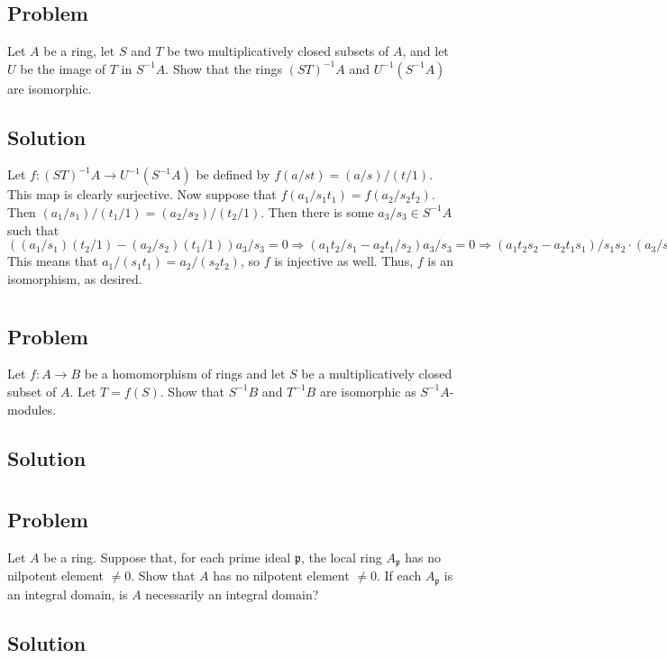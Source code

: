 \documentclass[book,12pt,oneside,openany]{memoir}
\begin{document}
\section{}
\subsection{Problem}
Let $A$ be a ring, let $S$ and $T$ be two multiplicatively closed subsets of $A$, and let $U$ be the image of $T$ in $S^{-1}A$. Show that the rings $(ST)^{-1}A$ and $U^{-1}(S^{-1}A)$ are isomorphic.

\subsection{Solution}
Let $f: (ST)^{-1}A \rightarrow U^{-1}(S^{-1}A)$ be defined by $f(a/st) = (a/s)/(t/1)$. This map is clearly surjective. Now suppose that $f(a_1/s_1t_1) = f(a_2/s_2t_2)$. Then $(a_1/s_1)/(t_1/1) = (a_2/s_2)/(t_2/1)$. Then there is some $a_3/s_3 \in S^{-1}A$ such that $((a_1/s_1)(t_2/1) - (a_2/s_2)(t_1/1))a_3/s_3 = 0 \Rightarrow (a_1 t_2/s_1 - a_2 t_1/s_2)a_3/s_3 = 0 \Rightarrow (a_1t_2s_2 - a_2 t_1s_1)/s_1 s_2 \cdot (a_3/s_3) = 0 \Rightarrow a_1t_2s_2a_3 - a_2 t_1 s_1 a_3 = 0 $ This means that $a_1/(s_1t_1) = a_2/(s_2t_2)$, so $f$ is injective as well. Thus, $f$ is an isomorphism, as desired.

\section{}
\subsection{Problem}
Let $f: A \rightarrow B$ be a homomorphism of rings and let $S$ be a multiplicatively closed subset of $A$. Let $T = f(S)$. Show that $S^{-1}B$ and $T^{-1}B$ are isomorphic as $S^{-1}A$-modules.

\subsection{Solution}

\section{}
\subsection{Problem}
Let $A$ be a ring. Suppose that, for each prime ideal $\mathfrak{p}$, the local ring $A_{\mathfrak{p}}$ has no nilpotent element $\neq 0$. Show that $A$ has no nilpotent element $\neq 0$. If each $A_{\mathfrak{p}}$ is an integral domain, is $A$ necessarily an integral domain?

\subsection{Solution}
\end{document}
